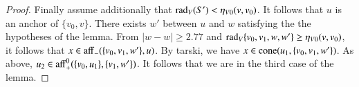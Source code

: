 \begin{proof}
Finally assume additionally that $\operatorname{rad}_V(S')<\eta_{V0}(v,v_0)$.
It follows that $u$ is an anchor of $\{v_0,v\}$.
There exists $w'$ between $u$ and $w$
satisfying the the hypotheses of the lemma.
From $|w-w|\ge 2.77$ and $\operatorname{rad}_V\{v_0,v_1,w,w'\} \ge \eta_{V0}(v,v_0)$,
it follows that $x\in {\operatorname{aff}}_-(\{v_0,v_1,w'\},u)$.  By tarski, we have $x\in{\operatorname{cone}}(u_1,\{v_0,v_1,w'\})$.
As above, $u_2\in{\operatorname{aff}}_+^0(\{v_0,u_1\},\{v_1,w'\})$. 
It follows that we are in the third case of the lemma.
\end{proof}

\newpage

